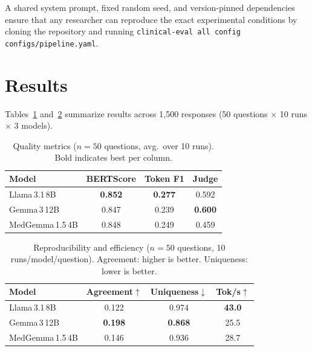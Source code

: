 \documentclass[11pt,twocolumn]{article}
\begin{document}
A shared system prompt, fixed random seed, and version-pinned
dependencies ensure that any researcher can reproduce the exact
experimental conditions by cloning the repository and running
\texttt{clinical-eval all \-\-config configs/pipeline.yaml}.

\section{Results}
\label{sec:results}

Tables~\ref{tab:quality} and~\ref{tab:repro} summarize results
across 1,500 responses (50 questions $\times$ 10 runs $\times$ 3 models).

\begin{table}[h]
\centering
\caption{Quality metrics ($n{=}50$ questions, avg.\ over 10 runs).
Bold indicates best per column.}
\label{tab:quality}
\small
\begin{tabular}{lccc}
\toprule
\textbf{Model} & \textbf{BERTScore} & \textbf{Token F1} & \textbf{Judge} \\
\midrule
Llama\,3.1\,8B      & \textbf{0.852} & \textbf{0.277} & 0.592 \\
Gemma\,3\,12B        & 0.847 & 0.239 & \textbf{0.600} \\
MedGemma\,1.5\,4B   & 0.848 & 0.249 & 0.459 \\
\bottomrule
\end{tabular}
\end{table}

\begin{table}[h]
\centering
\caption{Reproducibility and efficiency ($n{=}50$ questions,
10 runs/model/question). Agreement: higher is better.
Uniqueness: lower is better.}
\label{tab:repro}
\small
\begin{tabular}{lccc}
\toprule
\textbf{Model} & \textbf{Agreement$\uparrow$} & \textbf{Uniqueness$\downarrow$} & \textbf{Tok/s$\uparrow$} \\
\midrule
Llama\,3.1\,8B      & 0.122 & 0.974 & \textbf{43.0} \\
Gemma\,3\,12B        & \textbf{0.198} & \textbf{0.868} & 25.5 \\
MedGemma\,1.5\,4B   & 0.146 & 0.936 & 28.7 \\
\bottomrule
\end{tabular}
\end{table}
\end{document}
